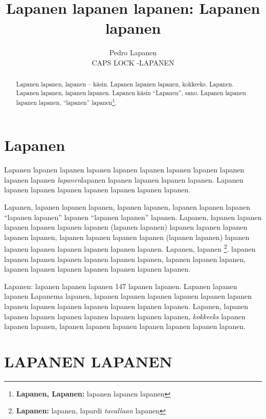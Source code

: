 \documentclass[a4paper]{article}
\title{Lapanen lapanen lapanen: Lapanen lapanen}
\date{}
\author{Pedro Lapanen\\CAPS LOCK -LAPANEN}
\begin{document}
\maketitle

\begin{multicols}{2}

\renewcommand{\abstractname}{Lapaslapanen}

\begin{abstract}

Lapanen lapanen, lapanen -- käsin. Lapanen lapanen lapanen, kokkeeks. Lapanen. Lapanen lapanen, lapanen lapanen.
Lapanen käsin ``Lapanen'', sano. Lapanen lapanen lapanen lapanen, ``lapanen'' lapanen\footnote{\textbf{Lapanen, Lapanen:} lapanen lapanen lapanen}.


\end{abstract}


\section{Lapanen}

Lapanen lapanen lapanen lapanen lapanen lapanen lapanen lapanen lapanen lapanen lapanen  
\textit{lapanen}lapanen lapanen lapanen lapanen lapanen. 
Lapanen lapanen lapanen lapanen lapanen lapanen lapanen lapanen.

Lapanen, lapanen lapanen lapanen, lapanen lapanen, lapanen lapanen lapanen ``lapanen lapanen'' lapanen ``lapanen lapanen'' lapanen.
Lapanen, lapanen lapanen lapanen lapanen lapanen lapanen (lapanen lapanen) \cite{lapanen} lapanen lapanen lapanen lapanen lapanen,
lapanen lapanen lapanen lapanen (lapanen lapanen) lapanen lapanen lapanen lapanen lapanen lapanen lapanen.
Lapanen, lapanen \footnote{\textbf{Lapanen:} lapanen, lapardi \textit{tavallaan} lapanen}. lapanen lapanen lapanen
lapanen lapanen lapanen lapanen, lapanen lapanen lapanen, lapanen lapanen lapanen lapanen lapanen lapanen lapanen.


Lapanen: lapanen lapanen lapanen 147 lapanen lapanen. Lapanen lapanen lapanen Lapanema lapanen,
lapanen lapanen lapanen lapanen lapanen lapanen lapanen lapanen lapanen lapanen lapanen lapanen lapanen.
Lapanen, lapanen lapanen lapanen lapanen lapanen lapanen \cite{liplap} lapanen lapanen, \textit{kokkeeks} lapanen lapanen lapanen, lapanen lapanen lapanen lapanen lapanen lapanen lapanen.


\section{LAPANEN LAPANEN}


\end{multicols}
\end{document}
